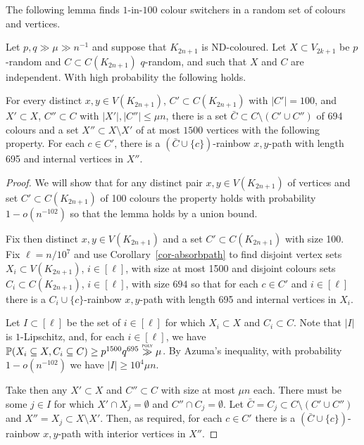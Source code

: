 The following lemma finds $1$-in-$100$ colour switchers in a random set of colours and vertices.
\begin{lemma}\label{lem-randabsorbpath}%
Let $p,q\gg \mu \gg n^{-1}$ and suppose that $K_{2n+1}$ is ND-coloured.  Let $X\subset V_{2k+1}$ be $p$-random and  $C\subset C(K_{2n+1})$ $q$-random, and such that $X$ and $C$ are independent. With high probability the following holds.

For every distinct $x,y\in V(K_{2n+1})$, $C'\subset C(K_{2n+1})$ with $|C'|=100$, and $X'\subset X$, $C''\subset C$ with $|X'|,|C''|\leq\mu n$,  there is a set $\bar{C}\subset C\setminus (C'\cup C'')$ of 694 colours and a set $X''\subset X\setminus X'$ of at most $1500$ vertices with the following property. For each $c\in C'$,
there is a $(\bar{C}\cup \{c\})$-rainbow $x,y$-path with length 695 and internal vertices in $X''$.
\end{lemma}
\begin{proof}
We will show that for any distinct pair $x,y\in V(K_{2n+1})$ of vertices and set $C'\subset C(K_{2n+1})$ of 100 colours the property holds with probability $1-o(n^{-102})$ so that the lemma holds by a union bound.

Fix then distinct $x,y\in V(K_{2n+1})$ and a set $C'\subset C(K_{2n+1})$ with size 100. Fix $\ell= n/10^7$ and use Corollary~\ref{cor-absorbpath} to find disjoint vertex sets $X_i\subset V(K_{2n+1})$, $i\in [\ell]$, with size at most 1500 and disjoint colours sets $C_i\subset C(K_{2n+1})$, $i\in [\ell]$, with size $694$ so that for each $c\in C'$ and $i\in [\ell]$ there is a $C_i\cup \{c\}$-rainbow $x,y$-path with length 695 and internal vertices in $X_i$. 

Let $I\subset [\ell]$ be the set of $i\in [\ell]$ for which $X_i\subset X$ and $C_i\subset C$. Note that $|I|$ is $1$-Lipschitz, and, for each $i\in [\ell]$, we have $\P(X_i\subseteq X, C_i\subseteq C)\geq p^{1500}q^{695}\gg \mu$.
By Azuma's inequality, with probability $1-o(n^{-102})$ we have $|I|\geq 10^4\mu n$.

Take then any $X'\subset X$ and $C''\subset C$ with size at most $\mu n$ each. There must be some $j\in I$ for which $X'\cap X_j=\emptyset$ and $C''\cap C_j=\emptyset$. Let $\bar{C}=C_j\subset C\setminus (C'\cup C'')$ and $X''=X_j\subset X\setminus X'$. Then, as required, for each $c\in C'$ there is a $(\bar{C}\cup\{c\})$-rainbow $x,y$-path with interior vertices in $X''$.
\end{proof}





